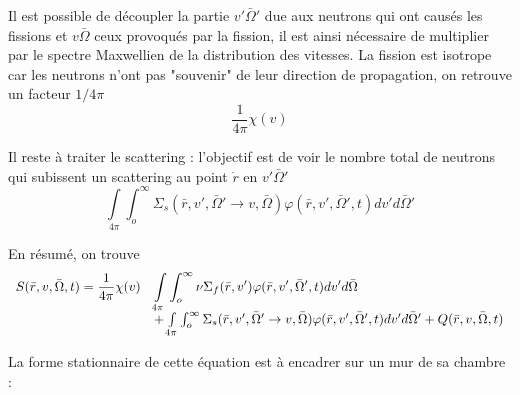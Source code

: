 Il est possible de découpler la partie $v'\bar \Omega'$ due aux neutrons qui ont causés les fissions
et $v\bar \Omega$ ceux provoqués par la fission, il est ainsi nécessaire de multiplier par le 
spectre Maxwellien de la distribution des vitesses. La fission est isotrope car les neutrons n'ont pas "souvenir" de leur direction de propagation, on retrouve un facteur $1/4\pi$
\begin{equation}
\frac{1}{{4\pi }}\chi (v)
\end{equation}

Il reste à traiter le scattering : l'objectif est de voir le nombre total de  neutrons qui subissent 
un scattering au point $\dot r$ en $v'\bar \Omega'$
\begin{equation}
\int\limits_{4\pi }    \int_o^\infty     {\Sigma _s}(\bar r,v',\bar \Omega ' \to v,\bar \Omega )\varphi (\bar r,v',\bar \Omega ',t)dv'd\bar \Omega '
\end{equation}

En résumé, on trouve
\begin{equation}
\begin{array}{ll}
\DS S(\bar r,v,\bar \Omega ,t) = \frac{1}{{4\pi }}\chi (v)&\DS\int\limits_{4\pi }    \int_o^\infty     \nu {\Sigma _f}(\bar r,v')\varphi (\bar r,v',\bar \Omega ',t)dv'd\bar \Omega\\ \DS& +
\int\limits_{4\pi }    \int_o^\infty     {\Sigma _s}(\bar r,v',\bar \Omega ' \to v,\bar \Omega )\varphi (\bar r,v',\bar \Omega ',t)dv'd\bar \Omega ' \DS+ Q(\bar r,v,\bar \Omega ,t)
\end{array}
\end{equation}

La forme stationnaire de cette équation est à encadrer sur un mur de sa chambre :\\

\ \\

